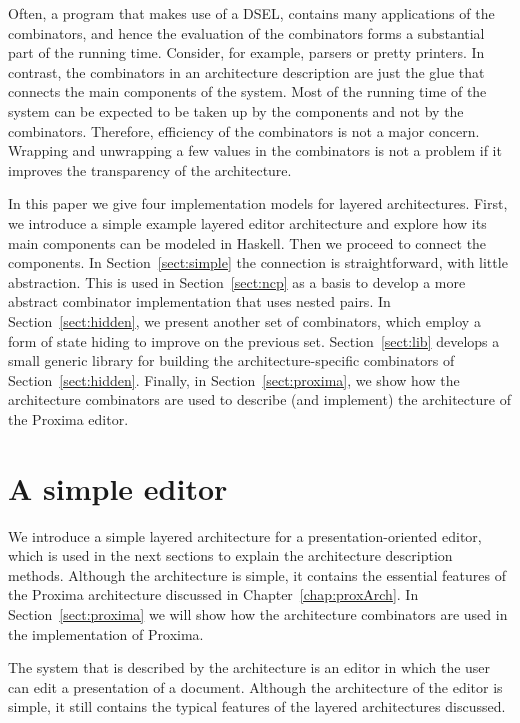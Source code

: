 \documentclass[preprint,natbib]{sigplanconf}
\begin{document}
Often, a program that makes use of a DSEL, contains many applications of the combinators, and hence the evaluation of the combinators forms a substantial part of the running time. Consider, for example, parsers or pretty printers. In contrast, the combinators in an architecture description are just the glue that connects the main components of the system. Most of the running time of the system can be expected to be taken up by the components and not by the combinators. Therefore, efficiency of the combinators is not a major concern. Wrapping and unwrapping a few values in the combinators is not a problem if it improves the transparency of the architecture.

In this paper we give four implementation models for layered architectures. First, we introduce a simple example layered editor architecture and explore how its main components can be modeled in Haskell. Then we proceed to connect the components. In Section~\ref{sect:simple} the connection is straightforward, with little abstraction. This is used in Section~\ref{sect:ncp} as a basis to develop a more abstract combinator implementation that uses nested pairs. In Section~\ref{sect:hidden}, we present another set of combinators, which employ a form of state hiding to improve on the previous set. Section~\ref{sect:lib} develops a small generic library for building the architecture-specific combinators of Section~\ref{sect:hidden}. 
\bc
Finally, in Section~\ref{sect:proxima}, we show how the architecture combinators are used to describe (and implement) the architecture of  the Proxima editor.%
\ec


%																
%																
%																
\section{A simple editor}


We introduce a simple layered architecture for a presentation-oriented editor, which is used in the next sections to explain the architecture description methods. Although the architecture is simple, it contains the essential features of the Proxima architecture discussed in Chapter~\ref{chap:proxArch}. In Section~\ref{sect:proxima} we will show how the architecture combinators are used in the implementation of Proxima.

The system that is described by the architecture is an
      editor in which the user can edit a presentation of a document. Although the
      architecture of the editor is simple, it still contains the typical features of
      the layered architectures discussed. 
\end{document}
